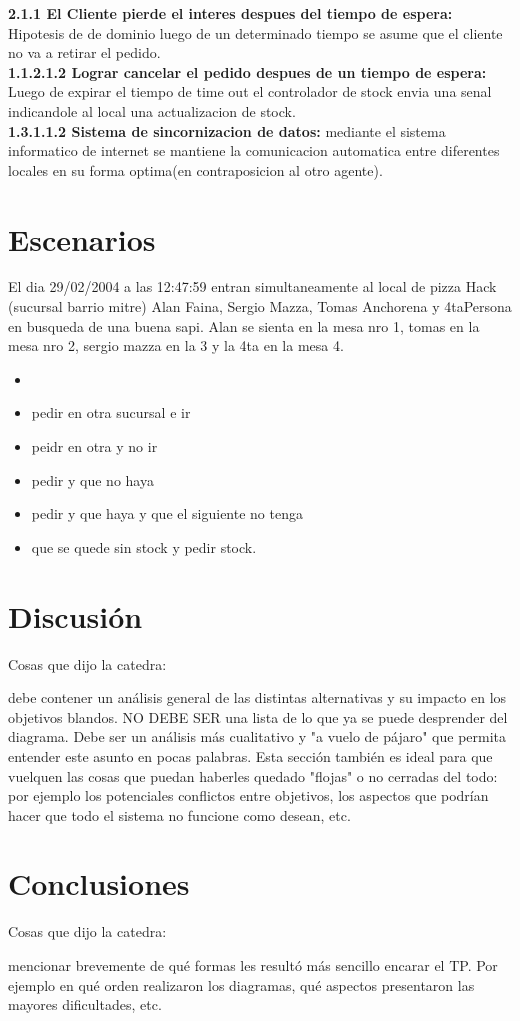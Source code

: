 \documentclass[a4paper,10pt]{article}
\begin{document}
\textbf{2.1.1 El Cliente pierde el interes despues del tiempo de espera:} Hipotesis de de dominio luego de un determinado tiempo se asume que el cliente no va a retirar el pedido.\\
\textbf{1.1.2.1.2 Lograr cancelar el pedido despues de un tiempo de espera:} Luego de expirar el tiempo de time out el controlador de stock envia una senal indicandole al local una actualizacion de stock.\\
\textbf{1.3.1.1.2 Sistema de sincornizacion de datos:}  mediante el sistema informatico de internet se mantiene la comunicacion automatica entre diferentes locales en su forma optima(en contraposicion al otro agente).\\


\newpage
\section*{Escenarios}

El dia 29/02/2004 a las 12:47:59 entran simultaneamente al local de pizza Hack (sucursal barrio mitre) Alan Faina, Sergio Mazza, Tomas Anchorena y 4taPersona en busqueda de una buena sapi. Alan se sienta en la mesa nro 1, tomas en la mesa nro 2, sergio mazza en la 3 y la 4ta en la mesa 4. 
\begin{itemize}\item
\item pedir en otra sucursal e ir
\item peidr en otra y no ir
\item pedir y que no haya
\item pedir y que haya y que el siguiente no tenga
\item que se quede sin stock y pedir stock.
\end{itemize}

\newpage
\section*{Discusi\'on}

Cosas que dijo la catedra:

debe contener un análisis general de las distintas
alternativas y su impacto en los objetivos blandos. NO DEBE SER una
lista de lo que ya se puede desprender del diagrama. Debe ser un
análisis más cualitativo y "a vuelo de pájaro" que permita entender
este asunto en pocas palabras. Esta sección también es ideal para que
vuelquen las cosas que puedan haberles quedado "flojas" o no cerradas
del todo: por ejemplo los potenciales conflictos entre objetivos, los
aspectos que podrían hacer que todo el sistema no funcione como
desean, etc.

\newpage
\section*{Conclusiones}

Cosas que dijo la catedra:

mencionar brevemente de qué formas les resultó más
sencillo encarar el TP. Por ejemplo en qué orden realizaron los
diagramas, qué aspectos presentaron las mayores dificultades, etc.
\end{document}
